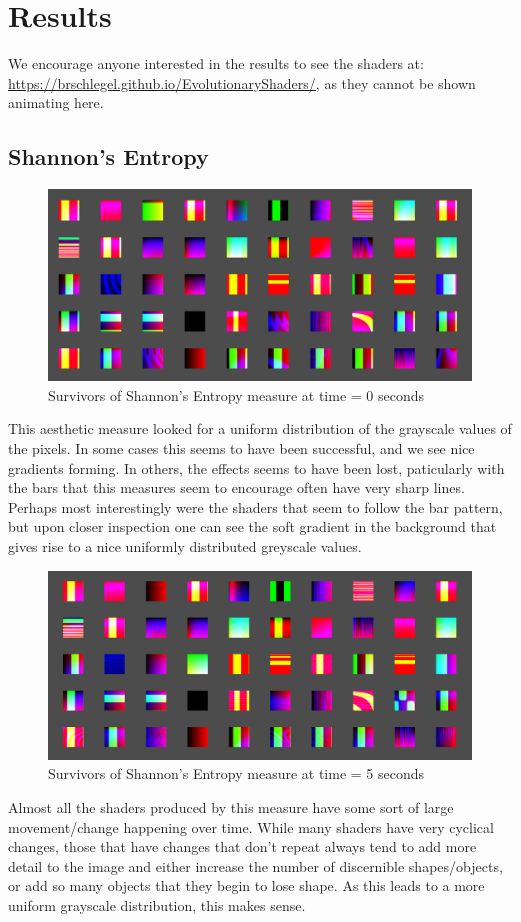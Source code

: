 \documentclass{acmart}
\begin{document}
\newpage
\section*{Results}
We encourage anyone interested in the results to see the shaders at: \url{https://brschlegel.github.io/EvolutionaryShaders/}, as they cannot be shown animating here.
\subsection*{Shannon's Entropy}
\begin{figure}[h!]
\caption{Survivors of Shannon's Entropy measure at time = 0 seconds}
\includegraphics[width =\textwidth]{Shannon_0.PNG}
\end{figure}

This aesthetic measure looked for a uniform distribution of the grayscale values of the pixels. In some cases this seems to have been successful, and we see nice gradients forming.
In others, the effects seems to have been lost, paticularly with the bars that this measures seem to encourage often have very sharp lines. Perhaps most interestingly were the shaders that
seem to follow the bar pattern, but upon closer inspection one can see the soft gradient in the background that gives rise to a nice uniformly distributed greyscale values.

\begin{figure}[h!]
\caption{Survivors of Shannon's Entropy measure at time = 5 seconds}
\includegraphics[width = \textwidth]{Shannon_5.PNG}
\end{figure}
Almost all the shaders produced by this measure have some sort of large movement/change happening over time. While many shaders have very cyclical changes, those that 
have changes that don't repeat always tend to add more detail to the image and either increase the number of discernible shapes/objects, or add so many objects that they begin to lose shape.
As this leads to a more uniform grayscale distribution, this makes sense.
\end{document}
